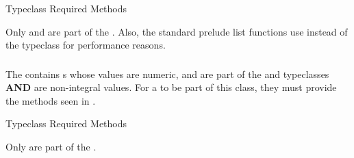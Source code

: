 \begin{listing}[h!tbp]
\caption{ Typeclass Required Methods}
\label{lst:Integral_Typeclass_Methods}
\end{listing}

Only  and  are part of the  .
Also, the standard prelude list functions use  instead of the  typeclass for performance reasons.

\subsubsection{\texorpdfstring{}{\texttt{Fractional}}}\label{subsubsec:Fractional_Typeclass}
The   contains s whose values are numeric, and are part of the  and  typeclasses \textbf{AND} are non-integral values.
For a  to be part of this class, they must provide the methods seen in .

\begin{listing}[h!tbp]
\caption{ Typeclass Required Methods}
\label{lst:Fractional_Typeclass_Methods}
\end{listing}

Only  are part of the  .

